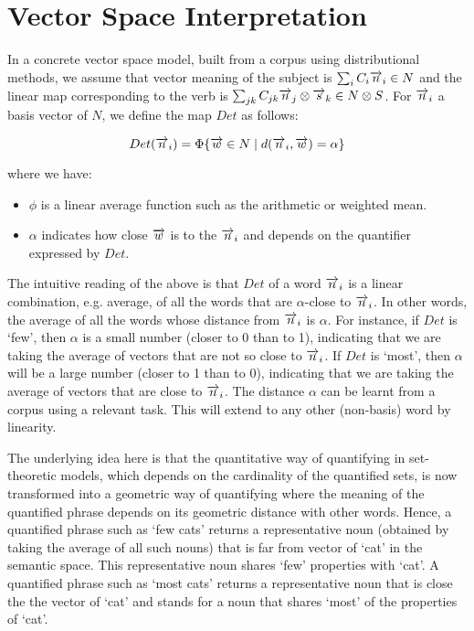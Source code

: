 \section{Vector Space Interpretation}


In a concrete vector space model, built from a corpus using distributional methods, we assume that  vector meaning of the subject is $\sum_i C_i \overrightarrow{n}_i \in N$ and the linear map corresponding to the verb is $\sum_{jk} C_{jk} \overrightarrow{n}_j \otimes \overrightarrow{s}_k \in N \otimes S$.  For $\overrightarrow{n}_i$ a basis vector of $N$, we define  the map $Det$  as follows:

\begin{equation}\label{eqDet}
Det(\overrightarrow{n}_i) = \Phi \{\overrightarrow{w} \in N \mid d(\overrightarrow{n}_i, \overrightarrow{w}) = \alpha\}
\end{equation}

\noindent
where we have:
\begin{itemize}
\item  $\phi$ is a linear average function such as the   arithmetic or weighted mean. 
\item  $\alpha$ indicates how close $\overrightarrow{w}$ is to the $\overrightarrow{n}_i$ and depends on the quantifier expressed by $Det$. 
\end{itemize}

\noindent
The intuitive reading of the above is that $Det$ of a word $\overrightarrow{n}_i$ is a linear combination, e.g.  average,  of all the words that are $\alpha$-close to $\overrightarrow{n}_i$. In other words, the average of all the words  whose distance from $\overrightarrow{n}_i$ is $\alpha$.  For instance, if $Det$ is `few', then $\alpha$ is a small number (closer to 0 than to 1), indicating that we are taking the average of vectors that are not so close to $\overrightarrow{n}_i$. If $Det$ is `most', then $\alpha$ will be a large number (closer to 1 than to 0), indicating that we are taking the average of vectors that are close to $\overrightarrow{n}_i$. The distance $\alpha$ can be learnt from a corpus using a relevant task. This will extend to any other (non-basis) word by linearity.  

The underlying idea here is that the quantitative way of quantifying in set-theoretic models, which depends on the cardinality of the quantified sets, is now transformed into a geometric way of quantifying where the meaning of the quantified phrase depends on its geometric distance with other words. Hence, a quantified phrase such as `few cats' returns a representative noun (obtained by taking the average of all such nouns) that is far from vector of  `cat'  in the semantic space. This representative noun shares `few' properties with `cat'. A quantified phrase such as `most cats' returns a representative noun that is close the the vector of `cat' and stands for a noun that shares `most' of the properties of `cat'. 


